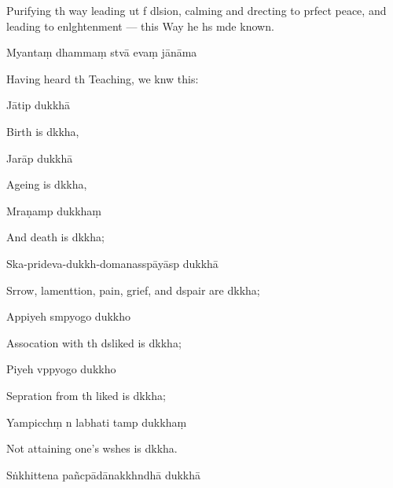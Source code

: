 \begin{english}
  Purifying th way leading ut f dlsion, calming and drecting to prfect peace, and leading to enlghtenment --- this Way he hs mde known.
\end{english}

Myantaṃ dhammaṃ stvā evaṃ jānāma

\begin{english}
  Having heard th Teaching, we knw this:
\end{english}

Jātip dukkhā

\begin{english}
  Birth is dkkha,
\end{english}

Jarāp dukkhā

\begin{english}
  Ageing is dkkha,
\end{english}

Mraṇamp dukkhaṃ

\begin{english}
  And death is dkkha;
\end{english}

Ska-prideva-dukkh-domanasspāyāsp dukkhā

\begin{english}
  Srrow, lamenttion, pain, grief, and dspair are dkkha;
\end{english}

Appiyeh smpyogo dukkho

\begin{english}
  Assocation with th dsliked is dkkha;
\end{english}

Piyeh vppyogo dukkho

\begin{english}
  Sepration from th liked is dkkha;
\end{english}

Yampicchṃ n labhati tamp dukkhaṃ

\begin{english}
  Not attaining one's wshes is dkkha.
\end{english}

Sṅkhittena pañcpādānakkhndhā dukkhā

